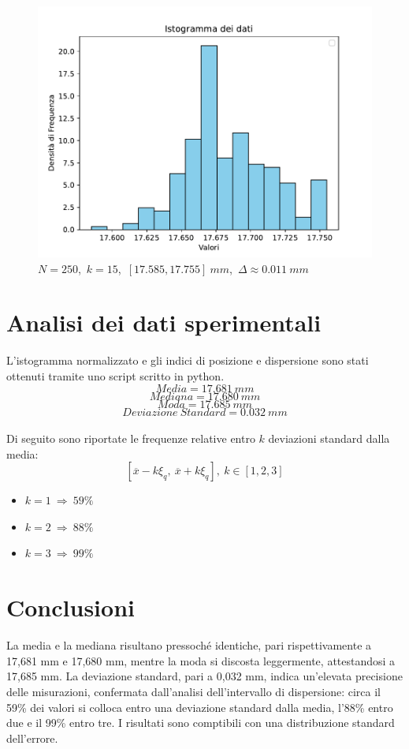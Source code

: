 \documentclass[11pt]{article}
\begin{document}
\begin{figure}[H]
  \centering
  \includegraphics[width=1\textwidth]{istogramma.pdf}
  \caption{$N=250$,\
   $k=15$,\
   $[17.585, 17.755]\ mm$,\
   $\Delta\approx0.011\ mm$}
\end{figure}

\section{Analisi dei dati sperimentali}
L'istogramma normalizzato e gli indici di posizione e dispersione sono stati ottenuti tramite uno script scritto in python.
\\
$$Media=17.681\ mm$$ 
$$Mediana=17.680\ mm$$ 
$$Moda=17.685\ mm$$ 
$$Deviazione\ Standard=0.032\ mm$$
\\
Di seguito sono riportate le frequenze relative entro $k$ deviazioni standard dalla media: $$[\overline{x}-k\xi_q,\ \overline{x}+k\xi_q],\ k\in[1,2,3]$$

\begin{itemize}
    \item $k=1 \ \Rightarrow \ 59\%$
    \item $k=2 \ \Rightarrow \ 88\%$
    \item $k=3 \ \Rightarrow \ 99\%$
\end{itemize}

\section{Conclusioni}
La media e la mediana risultano pressoché identiche, pari rispettivamente a 17,681 mm e 17,680 mm, mentre la moda si discosta leggermente, attestandosi a 17,685 mm. La deviazione standard, pari a 0,032 mm, indica un’elevata precisione delle misurazioni, confermata dall’analisi dell’intervallo di dispersione: circa il 59\% dei valori si colloca entro una deviazione standard dalla media, l’88\% entro due e il 99\% entro tre. I risultati sono comptibili con una distribuzione standard dell'errore.
\end{document}
